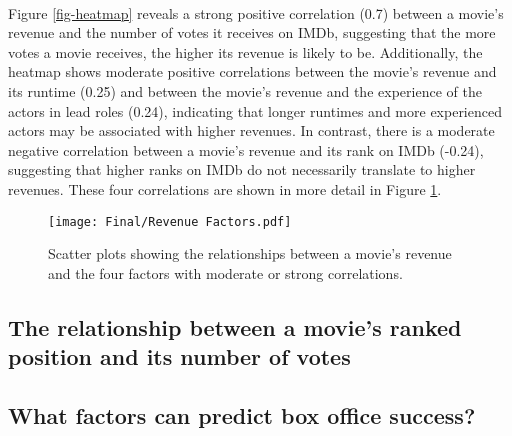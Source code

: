         \paragraph{}
            Figure \ref{fig-heatmap} reveals a strong positive correlation (0.7) between a
                movie's revenue and the number of votes it receives on IMDb, suggesting that
                the more votes a movie receives, the higher its revenue is likely to be.
            Additionally, the heatmap shows moderate positive correlations between the
                movie's revenue and its runtime (0.25) and between the movie's revenue and the
                experience of the actors in lead roles (0.24), indicating that longer runtimes
                and more experienced actors may be associated with higher revenues.
            In contrast, there is a moderate negative correlation between a movie's revenue
                and its rank on IMDb (-0.24), suggesting that higher ranks on IMDb do not
                necessarily translate to higher revenues.
            These four correlations are shown in more detail in Figure
                \ref{fig-revenue-factors}.

            \begin{figure}[H]
                \centering
                \texttt{[image: Final/Revenue Factors.pdf]}
                \caption[short]{
                    Scatter plots showing the relationships between a movie's revenue and the four
                    factors with moderate or strong correlations.
                }\label{fig-revenue-factors}
            \end{figure}

    \subsection{The relationship between a movie's ranked position and its number of votes}
        \paragraph{}

    \subsection{What factors can predict box office success?}
